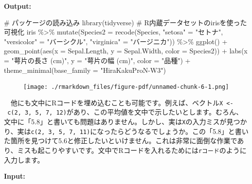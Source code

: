 \documentclass[
  a4paper,
  pandoc,
  ja=standard,
  jafont=haranoaji]{bxjsbook}
\newenvironment{Shaded}{\begin{snugshade}}{\end{snugshade}}
\newcommand{\AttributeTok}[1]{\textcolor[rgb]{0.00,0.48,0.65}{#1}}
\newcommand{\CommentTok}[1]{\textcolor[rgb]{0.37,0.37,0.37}{#1}}
\newcommand{\FunctionTok}[1]{\textcolor[rgb]{0.28,0.35,0.67}{#1}}
\newcommand{\NormalTok}[1]{\textcolor[rgb]{0.00,0.48,0.65}{#1}}
\newcommand{\OtherTok}[1]{\textcolor[rgb]{0.00,0.48,0.65}{#1}}
\newcommand{\SpecialCharTok}[1]{\textcolor[rgb]{0.37,0.37,0.37}{#1}}
\newcommand{\StringTok}[1]{\textcolor[rgb]{0.13,0.47,0.30}{#1}}
\begin{document}
\textbf{Output:}

\begin{Shaded}
\begin{Highlighting}[]
\CommentTok{\# パッケージの読み込み}
\FunctionTok{library}\NormalTok{(tidyverse)}
\CommentTok{\# R内蔵データセットのirisを使った可視化}
\NormalTok{iris }\SpecialCharTok{\%\textgreater{}\%}
  \FunctionTok{mutate}\NormalTok{(}\AttributeTok{Species2 =} \FunctionTok{recode}\NormalTok{(Species,}
                           \StringTok{"setosa"}     \OtherTok{=} \StringTok{"セトナ"}\NormalTok{,}
                           \StringTok{"versicolor"} \OtherTok{=} \StringTok{"バーシクル"}\NormalTok{,}
                           \StringTok{"virginica"}  \OtherTok{=} \StringTok{"バージニカ"}\NormalTok{)) }\SpecialCharTok{\%\textgreater{}\%}
  \FunctionTok{ggplot}\NormalTok{() }\SpecialCharTok{+}
  \FunctionTok{geom\_point}\NormalTok{(}\FunctionTok{aes}\NormalTok{(}\AttributeTok{x =}\NormalTok{ Sepal.Length, }\AttributeTok{y =}\NormalTok{ Sepal.Width, }\AttributeTok{color =}\NormalTok{ Species2)) }\SpecialCharTok{+}
  \FunctionTok{labs}\NormalTok{(}\AttributeTok{x =} \StringTok{"萼片の長さ (cm)"}\NormalTok{, }\AttributeTok{y =} \StringTok{"萼片の幅 (cm)"}\NormalTok{, }\AttributeTok{color =} \StringTok{"品種"}\NormalTok{) }\SpecialCharTok{+}
  \FunctionTok{theme\_minimal}\NormalTok{(}\AttributeTok{base\_family =} \StringTok{"HiraKakuProN{-}W3"}\NormalTok{)}
\end{Highlighting}
\end{Shaded}

\begin{figure}[H]

{\centering \texttt{[image: ./rmarkdown\_files/figure-pdf/unnamed-chunk-6-1.png]}

}

\end{figure}

　他にも文中にRコードを埋め込むことも可能です。例えば、ベクトル\texttt{X\ \textless{}-\ c(2,\ 3,\ 5,\ 7,\ 12)}があり、この平均値を文中で示したいとします。むろん、文中に「5.8」と書いても問題はありません。しかし、実は\texttt{X}の入力ミスが見つかり、実は\texttt{c(2,\ 3,\ 5,\ 7,\ 11)}になったらどうなるでしょうか。この「5.8」と書いた箇所を見つけて5.6と修正したいといけません。これは非常に面倒な作業であり、ミスも起こりやすいです。文中でRコードを入れるためには\texttt{\textasciigrave{}rコード\textasciigrave{}}のように入力します。

\textbf{Input:}
\end{document}
